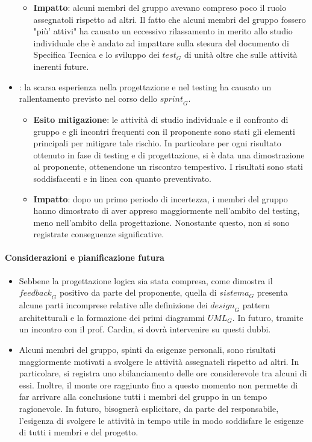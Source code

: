 \begin{itemize}
\begin{itemize}
        \item \textbf{Impatto}: alcuni membri del gruppo avevano compreso poco il ruolo assegnatoli rispetto ad altri. Il fatto che alcuni membri del gruppo fossero "più' attivi" ha causato un eccessivo rilassamento in merito allo studio individuale che è andato ad impattare sulla stesura del documento di Specifica Tecnica e lo sviluppo dei $\textit{test}_G$ di unità oltre che sulle attività inerenti future.
    \end{itemize}
    \item {}: la scarsa esperienza nella progettazione e nel testing ha causato un rallentamento previsto nel corso dello $\textit{sprint}_G$.
    \begin{itemize}
        \item \textbf{Esito mitigazione}: le attività di studio individuale e il confronto di gruppo e gli incontri frequenti con il proponente sono stati gli elementi principali per mitigare tale rischio. In particolare per ogni risultato ottenuto in fase di testing e di progettazione, si è data una dimostrazione al proponente, ottenendone un riscontro tempestivo. I risultati sono stati soddisfacenti e in linea con quanto preventivato.
        \item \textbf{Impatto}: dopo un primo periodo di incertezza, i membri del gruppo hanno dimostrato di aver appreso maggiormente nell'ambito del testing, meno nell'ambito della progettazione. Nonostante questo, non si sono registrate conseguenze significative.
    \end{itemize}
\end{itemize}
\paragraph*{Considerazioni e pianificazione futura}
\begin{itemize}
    \item Sebbene la progettazione logica sia stata compresa, come dimostra il $\textit{feedback}_G$ positivo da parte del proponente, quella di $\textit{sistema}_G$ presenta alcune parti incomprese relative alle definizione dei $\textit{design}_G$ pattern architetturali e la formazione dei primi diagrammi $\textit{UML}_G$. In futuro, tramite un incontro con il prof. Cardin, si dovrà intervenire su questi dubbi.
    \item Alcuni membri del gruppo, spinti da esigenze personali, sono risultati maggiormente motivati a svolgere le attività assegnateli rispetto ad altri. In particolare, si registra uno sbilanciamento delle ore considerevole tra alcuni di essi. Inoltre, il monte ore raggiunto fino a questo momento non permette di far arrivare alla conclusione tutti i membri del gruppo in un tempo ragionevole. In futuro, bisognerà esplicitare, da parte del responsabile, l'esigenza di svolgere le attività in tempo utile in modo soddisfare le esigenze di tutti i membri e del progetto. 
\end{itemize}
 